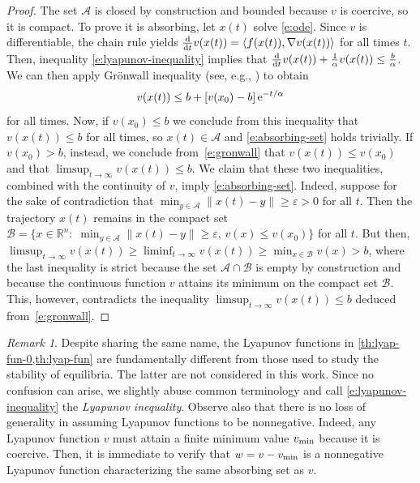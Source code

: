 \documentclass[11pt]{amsart}
\numberwithin{equation}{section}
\theoremstyle{plain}
\theoremstyle{definition}
\theoremstyle{remark}
\newtheorem{remark}{Remark}[section]
\newcommand{\R}{\mathbb{R}}
\renewcommand{\vec}[1]{{#1}}
\newcommand{\ip}[2]{\langle #1, #2 \rangle}
\newcommand{\ddt}{\frac{\rm d}{{\rm d} t}}
\begin{document}
\begin{proof}
The set $\mathcal{A}$ is closed by construction and bounded because $v$ is coercive, so it is compact. To prove it is absorbing, let $\vec{x}(t)$ solve \cref{e:ode}. Since $v$ is differentiable, the chain rule yields $\ddt v(\vec{x}(t)) = \ip{\vec{f}(\vec{x}(t))}{\nabla v(\vec{x}(t))}$ for all times $t$. Then, inequality \cref{e:lyapunov-inequality} implies that
$\ddt v(\vec{x}(t)) + \frac{1}{\alpha} v(\vec{x}(t)) \leq \frac{b}{\alpha}$. We can then apply Gr\"onwall inequality (see, e.g., \cite[Lemma~2.1]{DoeringGibbon1995}) to obtain
\begin{equation}\label{e:gronwall}
    v(\vec{x}(t)) \leq  b + \left[ v(\vec{x}_0) - b \right] {\rm e}^{-t/\alpha}
\end{equation} 
for all times. Now, if $v(\vec{x}_0) \leq b$ we conclude from this inequality that $v(\vec{x}(t)) \leq b$ for all times, so $\vec{x}(t) \in \mathcal{A}$ and \cref{e:absorbing-set} holds trivially. If $v(\vec{x}_0) > b$, instead, we conclude from~\cref{e:gronwall} that $v(\vec{x}(t)) \leq v(\vec{x}_0)$ and that $\limsup_{t\to\infty} v(\vec{x}(t)) \leq b$. We claim that these two inequalities, combined with the continuity of $v$, imply \cref{e:absorbing-set}. Indeed, suppose for the sake of contradiction that $\min_{y \in \mathcal{A}}\|\vec{x}(t) - y\| \geq \varepsilon > 0$ for all $t$. Then the trajectory $\vec{x}(t)$ remains in the compact set $\mathcal{B}=\{\vec{x}\in \R^n :\; \min_{y \in \mathcal{A}}\|\vec{x}(t) - y\| \geq \varepsilon,\, v(\vec{x})\leq v(\vec{x}_0)\}$ for all $t$. But then, $\limsup_{t\to\infty} v(\vec{x}(t)) \geq\liminf_{t\to\infty} v(\vec{x}(t)) \geq \min_{\vec{x}\in\mathcal{B}} v(\vec{x}) > b$, where the last inequality is strict because the set $\mathcal{A} \cap \mathcal{B}$ is empty by construction and because the continuous function $v$ attains its minimum on the compact set $\mathcal{B}$. This, however, contradicts the inequality  $\limsup_{t\to\infty} v(\vec{x}(t)) \leq b$ deduced from~\cref{e:gronwall}.
\end{proof} 

\begin{remark}
Despite sharing the same name, the Lyapunov functions in \cref{th:lyap-fun-0,th:lyap-fun} are fundamentally different from those used to study the stability of equilibria. The latter are not considered in this work. Since no confusion can arise, we slightly abuse common terminology and call \cref{e:lyapunov-inequality} the \emph{Lyapunov inequality}. Observe also that there is no loss of generality in assuming Lyapunov functions to be nonnegative. Indeed, any Lyapunov function $v$ must attain a finite minimum value $v_{\rm min}$ because it is coercive. Then, it is immediate to verify that $w=v-v_{\rm min}$ is a nonnegative Lyapunov function characterizing the same absorbing set as $v$.
\end{remark}
\end{document}

